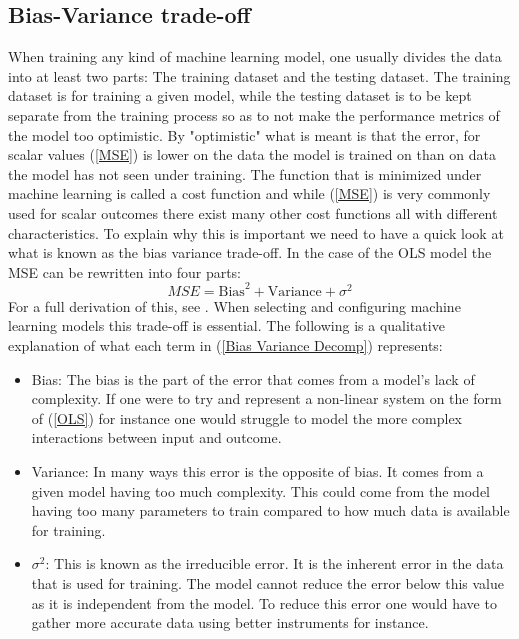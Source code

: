 \subsection{Bias-Variance trade-off}
\label{Bias-Variance trade-off}
When training any kind of machine learning model, one usually divides the data 
into at least two parts: The training dataset and the testing dataset. The training 
dataset is for training a given model, while the testing dataset is to be kept separate 
from the training process so as to not make the performance metrics of the model too optimistic. 
By "optimistic" what is meant is that the error, for scalar values (\ref{MSE}) is 
lower on the data the model is trained on than on data the model has not seen under 
training. The function that is minimized under machine learning is called a 
cost function and while (\ref{MSE}) is very commonly used for scalar outcomes 
there exist many other cost functions all with different characteristics. \citationneeded
To explain 
why this is important we need to have a quick look at what is known as the 
bias variance trade-off.
In the case of the OLS model the MSE can be rewritten into four parts:
\begin{equation}
    MSE = \text{Bias}^2 + \text{Variance} + \sigma^2
    \label{Bias Variance Decomp}
\end{equation}
For a full derivation of this, see \cite{vijayakumar2007bias}. When selecting and 
configuring machine learning models this trade-off is essential. The following is 
a qualitative explanation of what each term in (\ref{Bias Variance Decomp})
represents:
\begin{itemize}
\item Bias: The bias is the part of the error that comes from a model's lack of complexity.  If one were to try and represent a non-linear system on the form of (\ref{OLS}) for instance one would struggle to model the more complex interactions between input and outcome.
\item Variance: In many ways this error is the opposite of bias. It comes from a given model having too much complexity. This could come from the model having too many parameters to train compared to how much data is available for training. 
\item $\sigma^2$: This is known as the irreducible error. It is the inherent error in the data that is used for training. The model cannot reduce the error below this value as it is independent from the model. To reduce this error one would have to gather more accurate data using better instruments for instance. 
\end{itemize}
